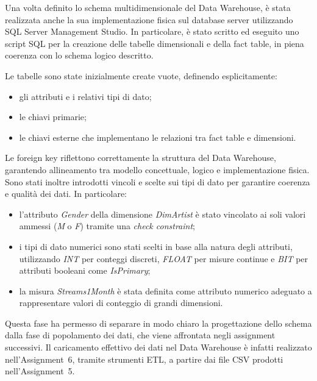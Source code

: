 Una volta definito lo schema multidimensionale del Data Warehouse, è stata
realizzata anche la sua implementazione fisica sul database server utilizzando
SQL Server Management Studio. In particolare, è stato scritto ed eseguito uno
script SQL per la creazione delle tabelle dimensionali e della fact table,
in piena coerenza con lo schema logico descritto.

Le tabelle sono state inizialmente create vuote, definendo esplicitamente:
\begin{itemize}
    \item gli attributi e i relativi tipi di dato;
    \item le chiavi primarie;
    \item le chiavi esterne che implementano le relazioni tra fact table e dimensioni.
\end{itemize}

Le foreign key riflettono correttamente la struttura del Data Warehouse,
garantendo allineamento tra modello concettuale, logico e implementazione fisica.
Sono stati inoltre introdotti vincoli e scelte sui tipi di dato per garantire
coerenza e qualità dei dati. In particolare:
\begin{itemize}
    \item l’attributo \textit{Gender} della dimensione \textit{DimArtist} è stato
    vincolato ai soli valori ammessi (\textit{M} o \textit{F}) tramite una
    \textit{check constraint};
    \item i tipi di dato numerici sono stati scelti in base alla natura degli
    attributi, utilizzando \textit{INT} per conteggi discreti,
    \textit{FLOAT} per misure continue e \textit{BIT} per attributi booleani
    come \textit{IsPrimary};
    \item la misura \textit{Streams1Month} è stata definita come attributo numerico
    adeguato a rappresentare valori di conteggio di grandi dimensioni.
\end{itemize}

Questa fase ha permesso di separare in modo chiaro la progettazione dello schema
dalla fase di popolamento dei dati, che viene affrontata negli assignment
successivi. Il caricamento effettivo dei dati nel Data Warehouse è infatti
realizzato nell’Assignment~6, tramite strumenti ETL, a partire dai file CSV
prodotti nell’Assignment~5.
